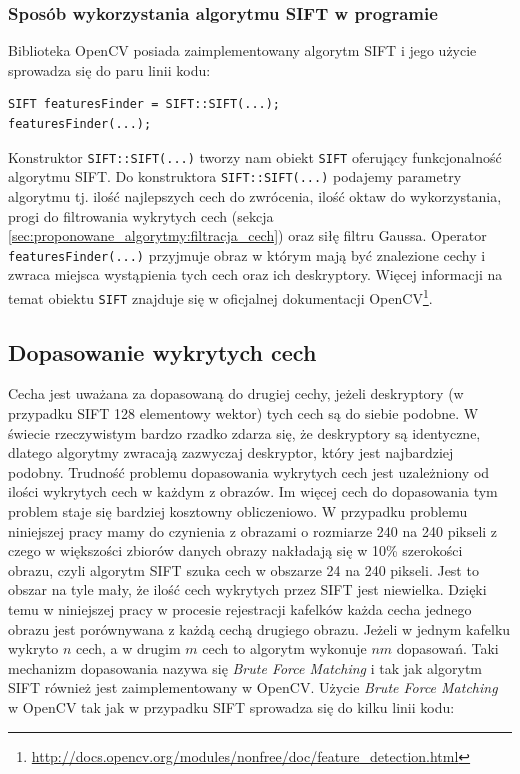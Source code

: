 \subsubsection{Sposób wykorzystania algorytmu SIFT w programie}
\label{sec:proponowane_algorytmy:sift_wykorzystanie}

Biblioteka OpenCV posiada zaimplementowany algorytm SIFT i jego użycie sprowadza się do paru linii kodu:

\begin{verbatim}
SIFT featuresFinder = SIFT::SIFT(...);
featuresFinder(...);
\end{verbatim}

Konstruktor \texttt{SIFT::SIFT(...)} tworzy nam obiekt \texttt{SIFT} oferujący funkcjonalność algorytmu SIFT. Do konstruktora \texttt{SIFT::SIFT(...)} podajemy parametry algorytmu tj. ilość najlepszych cech do zwrócenia, ilość oktaw do wykorzystania, progi do filtrowania wykrytych cech (sekcja \ref{sec:proponowane_algorytmy:filtracja_cech}) oraz siłę filtru Gaussa. Operator \texttt{featuresFinder(...)} przyjmuje obraz w którym mają być znalezione cechy i zwraca miejsca wystąpienia tych cech oraz ich deskryptory. Więcej informacji na temat obiektu \texttt{SIFT} znajduje się w oficjalnej dokumentacji OpenCV\footnote{\url{http://docs.opencv.org/modules/nonfree/doc/feature_detection.html}}.

\subsection{Dopasowanie wykrytych cech}
\label{sec:proponowane_algorytmy:dopasowanie}

Cecha jest uważana za dopasowaną do drugiej cechy, jeżeli deskryptory (w przypadku SIFT 128 elementowy wektor) tych cech są do siebie podobne. W świecie rzeczywistym bardzo rzadko zdarza się, że deskryptory są identyczne, dlatego algorytmy zwracają zazwyczaj deskryptor, który jest najbardziej podobny. Trudność problemu dopasowania wykrytych cech jest uzależniony od ilości wykrytych cech w każdym z obrazów. Im więcej cech do dopasowania tym problem staje się bardziej kosztowny obliczeniowo. W przypadku problemu niniejszej pracy mamy do czynienia z obrazami o rozmiarze 240 na 240 pikseli z czego w większości zbiorów danych obrazy nakładają się w 10\% szerokości obrazu, czyli algorytm SIFT szuka cech w obszarze 24 na 240 pikseli. Jest to obszar na tyle mały, że ilość cech wykrytych przez SIFT jest niewielka. Dzięki temu w niniejszej pracy w procesie rejestracji kafelków każda cecha jednego obrazu jest porównywana z każdą cechą drugiego obrazu. Jeżeli w jednym kafelku wykryto $n$ cech, a w drugim $m$ cech to algorytm wykonuje $nm$ dopasowań. Taki mechanizm dopasowania nazywa się \textit{Brute Force Matching} i tak jak algorytm SIFT również jest zaimplementowany w OpenCV. Użycie \textit{Brute Force Matching} w OpenCV tak jak w przypadku SIFT sprowadza się do kilku linii kodu:

